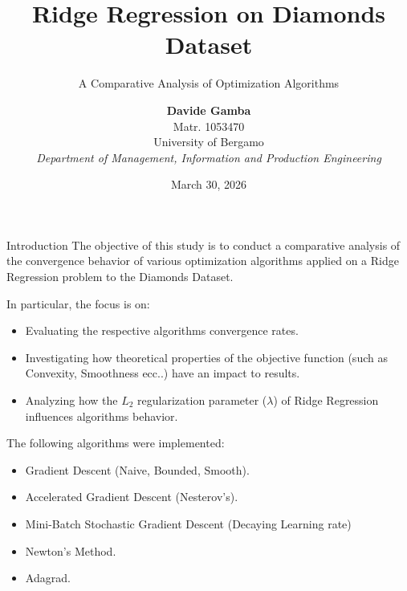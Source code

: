 \documentclass[10pt]{beamer}
\title[Ridge Regression Optimization]{Ridge Regression on Diamonds Dataset}
\subtitle{A Comparative Analysis of Optimization Algorithms}
\author[Davide Gamba, Matr 1053470]{
    \textbf{Davide Gamba} \texorpdfstring{\\}{, } 
    \small Matr. 1053470 \texorpdfstring{\\ \vspace{0.6cm}}{ - } 
    \small University of Bergamo \texorpdfstring{\\}{, } 
    \footnotesize \textit{Department of Management, Information and Production Engineering}
}
\date[30 March 2026]{March 30, 2026}
\begin{document}
\begin{frame}
    \titlepage
\end{frame}

\begin{frame}{Introduction}
    The objective of this study is to conduct a comparative analysis of the convergence behavior of various optimization algorithms applied on a Ridge Regression problem to the Diamonds Dataset.
    
    \vspace{0.3cm}
    In particular, the focus is on:
    \begin{itemize}
        \item Evaluating the respective algorithms convergence rates.
        \item Investigating how theoretical properties of the objective function (such as Convexity, Smoothness ecc..) have an impact to results.
        \item Analyzing how the $L_2$ regularization parameter ($\lambda$) of Ridge Regression influences algorithms behavior.
    \end{itemize}
    
    \vspace{0.3cm}
    The following algorithms were implemented:
    \begin{itemize}
      \item Gradient Descent (Naive, Bounded, Smooth). 
      \item Accelerated Gradient Descent (Nesterov's).
      \item Mini-Batch Stochastic Gradient Descent (Decaying Learning rate)
      \item Newton's Method.
      \item Adagrad.
    \end{itemize}

\end{frame}
\end{document}
